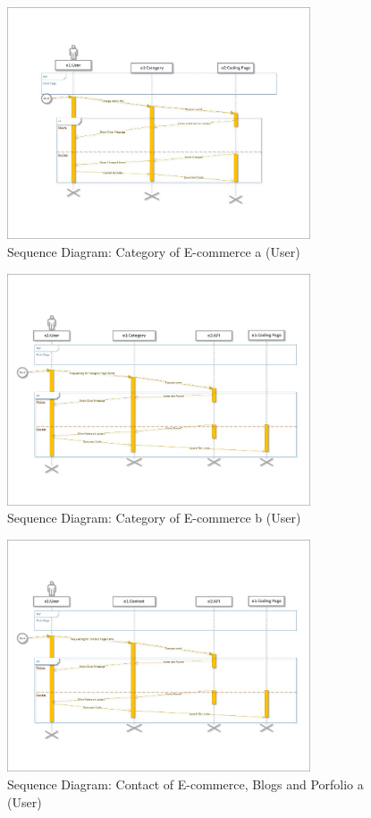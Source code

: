 \documentclass[12pt]{report}
\begin{document}
\begin{figure}[ht]
    \centering
    \includegraphics[width=0.8\textwidth]{Media/s1_Page_04.jpg} %
    \caption{Sequence Diagram: Category of E-commerce a (User)}
    \label{fig:drawing1}
\end{figure}

\begin{figure}[ht]
    \centering
    \includegraphics[width=0.8\textwidth]{Media/s1_Page_05.jpg} %
    \caption{Sequence Diagram: Category of E-commerce b (User)}
    \label{fig:drawing1}
\end{figure}

\begin{figure}[ht]
    \centering
    \includegraphics[width=0.8\textwidth]{Media/s1_Page_06.jpg} %
    \caption{Sequence Diagram: Contact of E-commerce, Blogs and Porfolio a (User)}
    \label{fig:drawing1}
\end{figure}
\end{document}

